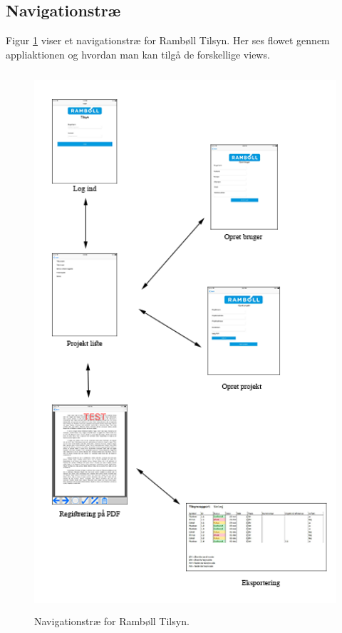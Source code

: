 \subsection{Navigationstræ}
Figur \ref{fig:Navi} viser et navigationstræ for Rambøll Tilsyn. Her ses flowet gennem appliaktionen og hvordan man kan tilgå de forskellige views.

\begin{figure}[H] %
	\centering
	\includegraphics[height=20cm, width=12cm]{../ArkitekturDesign/Design/Navigation/Navigation}
	\caption{Navigationstræ for Rambøll Tilsyn.}
	\label{fig:Navi}
\end{figure}

\clearpage